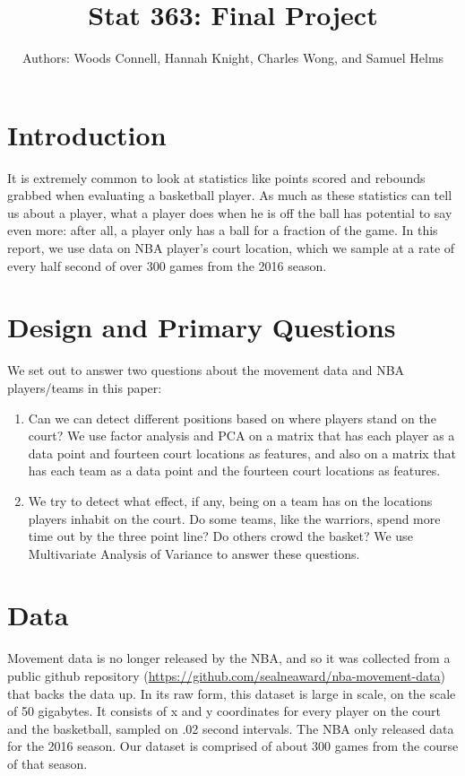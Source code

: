 \documentclass[]{article}
\title{Stat 363: Final Project}
\author{Authors: Woods Connell, Hannah Knight, Charles Wong, and Samuel Helms}
\date{}
\begin{document}
\maketitle

{
\setcounter{tocdepth}{3}
\tableofcontents
}
\section{Introduction}\label{introduction}

It is extremely common to look at statistics like points scored and
rebounds grabbed when evaluating a basketball player. As much as these
statistics can tell us about a player, what a player does when he is off
the ball has potential to say even more: after all, a player only has a
ball for a fraction of the game. In this report, we use data on NBA
player's court location, which we sample at a rate of every half second
of over 300 games from the 2016 season.

\section{Design and Primary
Questions}\label{design-and-primary-questions}

We set out to answer two questions about the movement data and NBA
players/teams in this paper:

\begin{enumerate}
\def\labelenumi{\arabic{enumi}.}
\item
  Can we can detect different positions based on where players stand on
  the court? We use factor analysis and PCA on a matrix that has each
  player as a data point and fourteen court locations as features, and
  also on a matrix that has each team as a data point and the fourteen
  court locations as features.
\item
  We try to detect what effect, if any, being on a team has on the
  locations players inhabit on the court. Do some teams, like the
  warriors, spend more time out by the three point line? Do others crowd
  the basket? We use Multivariate Analysis of Variance to answer these
  questions.
\end{enumerate}

\section{Data}\label{data}

Movement data is no longer released by the NBA, and so it was collected
from a public github repository
(\url{https://github.com/sealneaward/nba-movement-data}) that backs the
data up. In its raw form, this dataset is large in scale, on the scale
of 50 gigabytes. It consists of x and y coordinates for every player on
the court and the basketball, sampled on .02 second intervals. The NBA
only released data for the 2016 season. Our dataset is comprised of
about 300 games from the course of that season.
\end{document}
